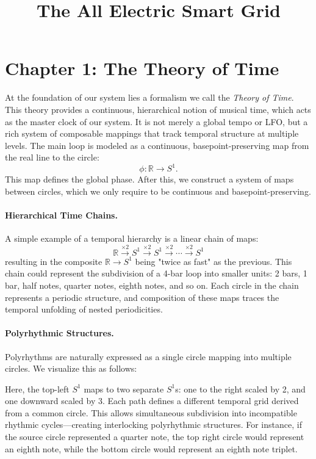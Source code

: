 \documentclass[12pt]{article}
\title{The All Electric Smart Grid}
\author{}
\date{}
\begin{document}
\maketitle

\section*{Chapter 1: The Theory of Time}

At the foundation of our system lies a formalism we call the \emph{Theory of Time}.  
This theory provides a continuous, hierarchical notion of musical time, which acts as the master clock of our system.  
It is not merely a global tempo or LFO, but a rich system of composable mappings that track temporal structure at multiple levels.  
The main loop is modeled as a continuous, basepoint-preserving map from the real line to the circle:
\[
\phi: \mathbb{R} \to S^1.
\]
This map defines the global phase.
After this, we construct a system of maps between circles, which we only require to be continuous and basepoint-preserving.

\paragraph{Hierarchical Time Chains.}  
A simple example of a temporal hierarchy is a linear chain of maps:
\[
\mathbb{R} \xrightarrow{\times 2} S^1 \xrightarrow{\times 2} S^1 \xrightarrow{\times 2} \cdots \xrightarrow{\times 2} S^1
\]
resulting in the composite $\mathbb{R} \to S^1$ being "twice as fast" as the previous.  
This chain could represent the subdivision of a 4-bar loop into smaller units: 2 bars, 1 bar, half notes, quarter notes, eighth notes, and so on.  
Each circle in the chain represents a periodic structure, and composition of these maps traces the temporal unfolding of nested periodicities.

\paragraph{Polyrhythmic Structures.}  
Polyrhythms are naturally expressed as a single circle mapping into multiple circles.
We visualize this as follows:
\begin{center}
\end{center}
Here, the top-left $S^1$ maps to two separate $S^1$s: one to the right scaled by 2, and one downward scaled by 3.
Each path defines a different temporal grid derived from a common circle.
This allows simultaneous subdivision into incompatible rhythmic cycles—creating interlocking polyrhythmic structures.
For instance, if the source circle represented a quarter note, the top right circle would represent an eighth note, while the bottom circle would represent an eighth note triplet.
\end{document}
